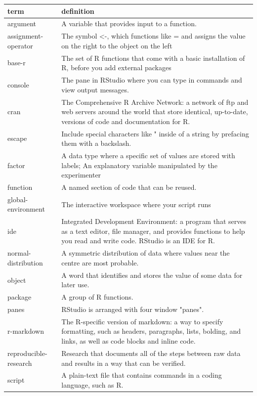 \documentclass[
  oneside]{book}
\begin{document}
\begin{tabular}{l|l}
\hline
term & definition\\
\hline
argument & A variable that provides input to a function.\\
\hline
assignment-operator & The symbol <-, which functions like = and assigns the value on the right to the object on the left\\
\hline
base-r & The set of R functions that come with a basic installation of R, before you add external packages\\
\hline
console & The pane in RStudio where you can type in commands and view output messages.\\
\hline
cran & The Comprehensive R Archive Network: a network of ftp and web servers around the world that store identical, up-to-date, versions of code and documentation for R.\\
\hline
escape & Include special characters like " inside of a string by prefacing them with a backslash.\\
\hline
factor & A data type where a specific set of values are stored with labels; An explanatory variable manipulated by the experimenter\\
\hline
function & A named section of code that can be reused.\\
\hline
global-environment & The interactive workspace where your script runs\\
\hline
ide & Integrated Development Environment: a program that serves as a text editor, file manager, and provides functions to help you read and write code. RStudio is an IDE for R.\\
\hline
normal-distribution & A symmetric distribution of data where values near the centre are most probable.\\
\hline
object & A word that identifies and stores the value of some data for later use.\\
\hline
package & A group of R functions.\\
\hline
panes & RStudio is arranged with four window "panes".\\
\hline
r-markdown & The R-specific version of markdown: a way to specify formatting, such as headers, paragraphs, lists, bolding, and links, as well as code blocks and inline code.\\
\hline
reproducible-research & Research that documents all of the steps between raw data and results in a way that can be verified.\\
\hline
script & A plain-text file that contains commands in a coding language, such as R.\\

\end{tabular}
\end{document}
